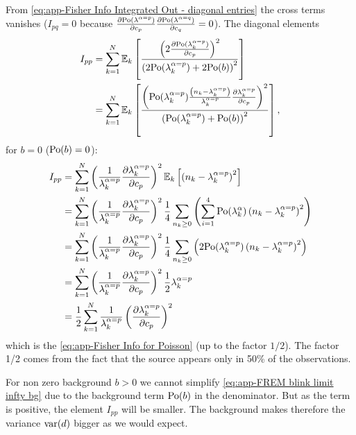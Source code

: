 From \autoref{eq:app-Fisher Info Integrated Out - diagonal entries} the cross terms vanishes ($I_{pq}=0$ because $\frac{\partial\mathrm{Po}(\lambda^{\alpha=p})}{\partial c_p}\frac{\partial\mathrm{Po}(\lambda^{\alpha=q})}{\partial c_{q}}=0$). The diagonal elements 
%
\begin{alignat}{1}
	I_{pp} 
	& =\sum_{k=1}^N\mathbb{E}_k\left[\frac{\left(2\frac{\partial\mathrm{Po}(\lambda_k^{\alpha=p})}{\partial c_p}\right)^2}{\left(2\mathrm{Po}(\lambda_k^{\alpha=p})+2\mathrm{Po}(b)\right)^2}\right]\\
 	& =\sum_{k=1}^N\mathbb{E}_k\left[\frac{\left(\mathrm{Po}(\lambda_k^{\alpha=p})\frac{\left(n_k-\lambda_k^{\alpha=p}\right)}{\lambda_k^{\alpha=p}}\frac{\partial\lambda_k^{\alpha=p}}{\partial c_p}\right)^2}{\left(\mathrm{Po}(\lambda_k^{\alpha=p})+\mathrm{Po}(b)\right)^2}\right],
	\label{eq:app-FREM blink limit infty bg}
\end{alignat}
%
for $b=0$ ($\mathrm{Po}(b)=0$):
%
\begin{alignat*}{1}
	I_{pp} 
	 &=\sum_{k=1}^N\left(\frac{1}{\lambda_k^{\alpha=p}}\frac{\partial\lambda_k^{\alpha=p}}{\partial c_p}\right)^2\mathbb{E}_k\left[\left(n_k-\lambda_k^{\alpha=p}\right)^2\right]\\
 	& =\sum_{k=1}^N\left(\frac{1}{\lambda_k^{\alpha=p}}\frac{\partial\lambda_k^{\alpha=p}}{\partial c_p}\right)^2\frac{1}{4}\sum_{n_k\geq0}\left(\sum_{i=1}^4\mathrm{Po}(\lambda_k^\alpha)\left(n_k-\lambda_k^{\alpha=p}\right)^2\right)\\
 	& =\sum_{k=1}^N\left(\frac{1}{\lambda_k^{\alpha=p}}\frac{\partial\lambda_k^{\alpha=p}}{\partial c_p}\right)^2\frac{1}{4}\sum_{n_k\geq0}\left(2\mathrm{Po}(\lambda_k^{\alpha=p})\left(n_k-\lambda_k^{\alpha=p}\right)^2\right)\\
 	& =\sum_{k=1}^N\left(\frac{1}{\lambda_k^{\alpha=p}}\frac{\partial\lambda_k^{\alpha=p}}{\partial c_p}\right)^2\frac{1}{2}\lambda_k^{\alpha=p}\\
 	& =\frac{1}{2}\sum_{k=1}^N\frac{1}{\lambda_k^{\alpha=p}}\left(\frac{\partial\lambda_k^{\alpha=p}}{\partial c_p}\right)^2
\end{alignat*}
%
which is the \autoref{eq:app-Fisher Info for Poisson} (up to the factor $1/2$). The factor 1/2 comes from the fact that the source appears only in 50\% of the observations.

For non zero background $b>0$ we cannot simplify \autoref{eq:app-FREM blink limit infty bg} due to the background term $\mathrm{Po}(b)$ in the denominator. But as the term is positive, the element $I_{pp}$ will be smaller. The background makes therefore the variance $\mathrm{var}(d)$ bigger as we would expect.

